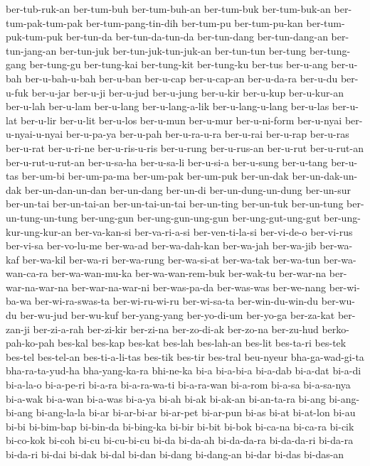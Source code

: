 {ber-tub-ruk-an ber-tum-buh ber-tum-buh-an ber-tum-buk ber-tum-buk-an
ber-tum-pak-tum-pak ber-tum-pang-tin-dih ber-tum-pu ber-tum-pu-kan
ber-tum-puk-tum-puk ber-tun-da ber-tun-da-tun-da ber-tun-dang
ber-tun-dang-an ber-tun-jang-an ber-tun-juk ber-tun-juk-tun-juk-an
ber-tun-tun ber-tung ber-tung-gang ber-tung-gu ber-tung-kai ber-tung-kit
ber-tung-ku ber-tus ber-u-ang ber-u-bah ber-u-bah-u-bah ber-u-ban
ber-u-cap ber-u-cap-an ber-u-da-ra ber-u-du ber-u-fuk ber-u-jar ber-u-ji
ber-u-jud ber-u-jung ber-u-kir ber-u-kup ber-u-kur-an ber-u-lah ber-u-lam
ber-u-lang ber-u-lang-a-lik ber-u-lang-u-lang ber-u-las ber-u-lat
ber-u-lir ber-u-lit ber-u-los ber-u-mun ber-u-mur ber-u-ni-form ber-u-nyai
ber-u-nyai-u-nyai ber-u-pa-ya ber-u-pah ber-u-ra-u-ra ber-u-rai ber-u-rap
ber-u-ras ber-u-rat ber-u-ri-ne ber-u-ris-u-ris ber-u-rung ber-u-rus-an
ber-u-rut ber-u-rut-an ber-u-rut-u-rut-an ber-u-sa-ha ber-u-sa-li
ber-u-si-a ber-u-sung ber-u-tang ber-u-tas ber-um-bi ber-um-pa-ma
ber-um-pak ber-um-puk ber-un-dak ber-un-dak-un-dak ber-un-dan-un-dan
ber-un-dang ber-un-di ber-un-dung-un-dung ber-un-sur ber-un-tai
ber-un-tai-an ber-un-tai-un-tai ber-un-ting ber-un-tuk ber-un-tung
ber-un-tung-un-tung ber-ung-gun ber-ung-gun-ung-gun ber-ung-gut-ung-gut
ber-ung-kur-ung-kur-an ber-va-kan-si ber-va-ri-a-si ber-ven-ti-la-si
ber-vi-de-o ber-vi-rus ber-vi-sa ber-vo-lu-me ber-wa-ad ber-wa-dah-kan
ber-wa-jah ber-wa-jib ber-wa-kaf ber-wa-kil ber-wa-ri ber-wa-rung
ber-wa-si-at ber-wa-tak ber-wa-tun ber-wa-wan-ca-ra ber-wa-wan-mu-ka
ber-wa-wan-rem-buk ber-wak-tu ber-war-na ber-war-na-war-na
ber-war-na-war-ni ber-was-pa-da ber-was-was ber-we-nang ber-wi-ba-wa
ber-wi-ra-swas-ta ber-wi-ru-wi-ru ber-wi-sa-ta ber-win-du-win-du ber-wu-du
ber-wu-jud ber-wu-kuf ber-yang-yang ber-yo-di-um ber-yo-ga ber-za-kat
ber-zan-ji ber-zi-a-rah ber-zi-kir ber-zi-na ber-zo-di-ak ber-zo-na
ber-zu-hud berko-pah-ko-pah bes-kal bes-kap bes-kat bes-lah bes-lah-an
bes-lit bes-ta-ri bes-tek bes-tel bes-tel-an bes-ti-a-li-tas bes-tik
bes-tir bes-tral beu-nyeur bha-ga-wad-gi-ta bha-ra-ta-yud-ha
bha-yang-ka-ra bhi-ne-ka bi-a bi-a-bi-a bi-a-dab bi-a-dat bi-a-di
bi-a-la-o bi-a-pe-ri bi-a-ra bi-a-ra-wa-ti bi-a-ra-wan bi-a-rom bi-a-sa
bi-a-sa-nya bi-a-wak bi-a-wan bi-a-was bi-a-ya bi-ah bi-ak bi-ak-an
bi-an-ta-ra bi-ang bi-ang-bi-ang bi-ang-la-la bi-ar bi-ar-bi-ar bi-ar-pet
bi-ar-pun bi-as bi-at bi-at-lon bi-au bi-bi bi-bim-bap bi-bin-da
bi-bing-ka bi-bir bi-bit bi-bok bi-ca-na bi-ca-ra bi-cik bi-co-kok bi-coh
bi-cu bi-cu-bi-cu bi-da bi-da-ah bi-da-da-ra bi-da-da-ri bi-da-ra bi-da-ri
bi-dai bi-dak bi-dal bi-dan bi-dang bi-dang-an bi-dar bi-das bi-das-an
}
